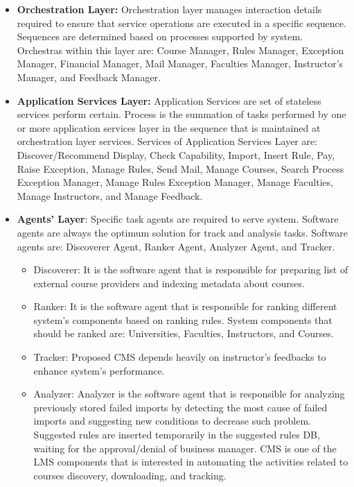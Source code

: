 \documentclass[12pt,a4paper,final,twoside,onecolumn,titlepage]{book}
\begin{document}
\begin{itemize}
\item \textbf{Orchestration Layer:} Orchestration layer manages interaction details required to ensure that service operations are executed in a specific sequence. Sequences are determined based on processes supported by system. Orchestras within this layer are: Course Manager, Rules Manager, Exception Manager, Financial Manager, Mail Manager, Faculties Manager, Instructor’s Manager, and Feedback Manager.
\item \textbf{Application Services Layer:} Application Services are set of stateless services perform certain. Process is the summation of tasks performed by one or more application services layer in the sequence that is maintained at orchestration layer services. Services of Application Services Layer are: Discover/Recommend Display, Check Capability, Import, Insert Rule, Pay, Raise Exception, Manage Rules, Send Mail, Manage Courses, Search Process Exception Manager, Manage Rules Exception Manager, Manage Faculties, Manage Instructors, and Manage Feedback.
\item \textbf{Agents’ Layer}: Specific task agents are required to serve system. Software agents are always the optimum solution for track and analysis tasks. Software agents are: Discoverer Agent, Ranker Agent, Analyzer Agent, and Tracker.
\begin{itemize}
\item Discoverer: It is the software agent that is responsible for preparing list of external course providers and indexing metadata about courses.
\item Ranker: It is the software agent that is responsible for ranking different system’s components based on ranking rules. System components that should be ranked are: Universities, Faculties, Instructors, and Courses.
\item Tracker: Proposed \gls{CMS} depends heavily on instructor’s feedbacks to enhance system’s performance.
\item Analyzer: Analyzer is the software agent that is responsible for analyzing previously stored failed imports by detecting the most cause of failed imports and suggesting new conditions to decrease such problem. Suggested rules are inserted temporarily in the suggested rules \gls{DB}, waiting for the approval/denial of business manager.
\gls{CMS} is one of the \gls{LMS} components that is interested in automating the activities related to courses discovery, downloading, and tracking.
\end{itemize}
\end{itemize}
\end{document}
